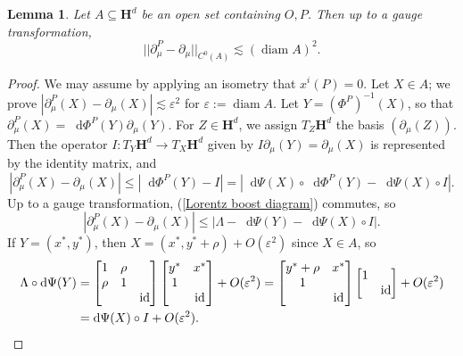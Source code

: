 \documentclass[reqno,10pt]{amsart}
\newcommand{\Hyp}{\mathbf H}
\DeclareMathOperator{\diam}{diam}
\DeclareMathOperator{\id}{id}
\newcommand*\dif{\mathop{}\!\mathrm{d}}
\newtheorem{lemma}[theorem]{Lemma}
\theoremstyle{definition}
\numberwithin{equation}{section}
\begin{document}
\begin{lemma}
Let $A \subseteq \Hyp^d$ be an open set containing $O, P$.
Then up to a gauge transformation,
\begin{equation}\label{difference of vector fields}
||\partial^P_\mu - \partial_\mu||_{C^0(A)} \lesssim (\diam A)^2.
\end{equation}
\end{lemma}
\begin{proof}
We may assume by applying an isometry that $x^i(P) = 0$.
Let $X \in A$; we prove $|\partial^P_\mu(X) - \partial_\mu(X)| \lesssim \varepsilon^2$ for $\varepsilon := \diam A$.
Let $Y = (\Phi^P)^{-1}(X)$, so that $\partial^P_\mu(X) = \dif \Phi^P(Y) \partial_\mu(Y)$.
For $Z \in \Hyp^d$, we assign $T_Z \Hyp^d$ the basis $(\partial_\mu(Z))$.
Then the operator $I: T_Y \Hyp^d \to T_X \Hyp^d$ given by $I \partial_\mu(Y) = \partial_\mu(X)$ is represented by the identity matrix, and
$$|\partial^P_\mu(X) - \partial_\mu(X)| \leq |\dif \Phi^P(Y) - I| = |\dif \Psi(X) \circ \dif \Phi^P(Y) - \dif \Psi(X) \circ I|.$$
Up to a gauge transformation, (\ref{Lorentz boost diagram}) commutes, so
$$|\partial^P_\mu(X) - \partial_\mu(X)| \leq |\Lambda - \dif \Psi(Y) - \dif \Psi(X) \circ I|.$$
If $Y = (x^*, y^*)$, then $X = (x^*, y^* + \rho) + O(\varepsilon^2)$ \cite[(4.5.5)]{ratcliffe2006foundations} since $X \in A$, so
\begin{align*}
\Lambda \circ \dif \Psi(Y) &= \begin{bmatrix}1 & \rho \\ \rho & 1 \\ && \id \end{bmatrix} \begin{bmatrix}y^* & x^* \\ 1 \\ & \id \end{bmatrix} + O(\varepsilon^2) = \begin{bmatrix}y^* + \rho & x^* \\ 1 \\ & \id\end{bmatrix} \begin{bmatrix}1 \\ & \id\end{bmatrix} + O(\varepsilon^2) \\
&= \dif \Psi(X) \circ I + O(\varepsilon^2). \qedhere
\end{align*}
\end{proof}
\end{document}
